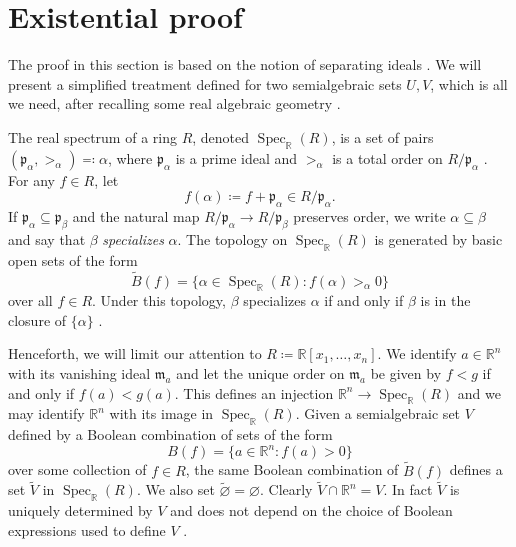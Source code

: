 \documentclass[11pt]{amsart}
\theoremstyle{plain}
\theoremstyle{definition}
\DeclareMathOperator{\Spec}{Spec}
\begin{document}
\section{Existential proof}\label{sec:noneff}

The proof in this section is based on the notion of separating ideals \cite{Madden1989}. We will present a simplified treatment defined for two semialgebraic sets $U, V$, which is all we need, after recalling some real algebraic geometry \cite{bochnak2013real, Madden1989}.

The real spectrum of a ring $R$, denoted $\Spec_{\mathbb{R}}(R)$, is a set of pairs $(\mathfrak{p}_\alpha, >_\alpha) \eqqcolon \alpha$, where $\mathfrak{p}_\alpha$ is a prime ideal and $>_\alpha$ is a total order on $R/\mathfrak{p}_\alpha$ \cite[Proposition~7.1.2]{bochnak2013real}.  For any $f \in R$, let
\begin{equation}\label{eq:extend}
f(\alpha) \coloneqq f + \mathfrak{p}_\alpha \in R/\mathfrak{p}_\alpha.
\end{equation}
If $\mathfrak{p}_\alpha \subseteq \mathfrak{p}_\beta$ and the natural map $R/\mathfrak{p}_\alpha \to R/\mathfrak{p}_\beta$ preserves order, we write $\alpha \subseteq \beta$ and say that $\beta$ \emph{specializes} $\alpha$. The topology on $\Spec_{\mathbb{R}}(R)$ is generated by basic open sets of the form
\[
\widetilde{B}(f) = \{\alpha \in \Spec_{\mathbb{R}}(R)  : f(\alpha) >_\alpha 0\}
\]
over all $f \in R$. Under this topology, $\beta$ specializes $\alpha$ if and only if $\beta$ is in the closure of $\{\alpha\}$  \cite[Proposition~7.1.18]{bochnak2013real}.


Henceforth, we will limit our attention to $R \coloneqq \mathbb{R}[x_1, \dots, x_n]$.  We identify $a \in \mathbb{R}^n$ with its vanishing ideal $\mathfrak{m}_a$ and let the unique order on  $\mathfrak{m}_a$ be given by $f < g$ if and only if $f(a) < g(a)$. This defines an injection $\mathbb{R}^n \to \Spec_{\mathbb{R}}(R)$ and we may identify $\mathbb{R}^n$ with its image in $\Spec_{\mathbb{R}}(R)$. Given a semialgebraic set $V$ defined by a Boolean combination of sets of the form
\[
B(f) = \{a \in \mathbb{R}^n  : f(a) > 0\}
\]
over some collection of  $f\in R$, the same Boolean combination of $\widetilde{B}(f)$ defines a set $\widetilde{V}$ in $ \Spec_{\mathbb{R}}(R) $. We also set $\widetilde{\varnothing} = \varnothing$. Clearly $\widetilde{V} \cap \mathbb{R}^n = V$. In fact $\widetilde{V}$ is uniquely determined by $V$ and does not depend on the choice of Boolean expressions used to define $V$ \cite[Proposition 7.2.2]{bochnak2013real}.
\end{document}
